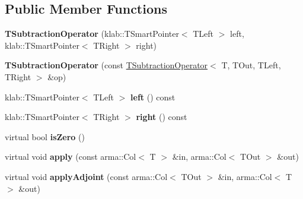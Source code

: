 \subsection*{Public Member Functions}
\begin{DoxyCompactItemize}
\item 
{\bfseries T\+Subtraction\+Operator} (klab\+::\+T\+Smart\+Pointer$<$ T\+Left $>$ left, klab\+::\+T\+Smart\+Pointer$<$ T\+Right $>$ right)\hypertarget{classkl1p_1_1TSubtractionOperator_a8eed24092100f90b1ef3cf6a87b5b385}{}\label{classkl1p_1_1TSubtractionOperator_a8eed24092100f90b1ef3cf6a87b5b385}

\item 
{\bfseries T\+Subtraction\+Operator} (const \hyperlink{classkl1p_1_1TSubtractionOperator}{T\+Subtraction\+Operator}$<$ T, T\+Out, T\+Left, T\+Right $>$ \&op)\hypertarget{classkl1p_1_1TSubtractionOperator_a0c53e2eefb1aac7df9517839f3235cdb}{}\label{classkl1p_1_1TSubtractionOperator_a0c53e2eefb1aac7df9517839f3235cdb}

\item 
klab\+::\+T\+Smart\+Pointer$<$ T\+Left $>$ {\bfseries left} () const \hypertarget{classkl1p_1_1TSubtractionOperator_a6fbc380e9cc3176aa841716d2ce92c34}{}\label{classkl1p_1_1TSubtractionOperator_a6fbc380e9cc3176aa841716d2ce92c34}

\item 
klab\+::\+T\+Smart\+Pointer$<$ T\+Right $>$ {\bfseries right} () const \hypertarget{classkl1p_1_1TSubtractionOperator_a3489bea4e6d6fe9a89e960a59f33b1a7}{}\label{classkl1p_1_1TSubtractionOperator_a3489bea4e6d6fe9a89e960a59f33b1a7}

\item 
virtual bool {\bfseries is\+Zero} ()\hypertarget{classkl1p_1_1TSubtractionOperator_a85bca636edf8c4c0c6c8446d3a225ff3}{}\label{classkl1p_1_1TSubtractionOperator_a85bca636edf8c4c0c6c8446d3a225ff3}

\item 
virtual void {\bfseries apply} (const arma\+::\+Col$<$ T $>$ \&in, arma\+::\+Col$<$ T\+Out $>$ \&out)\hypertarget{classkl1p_1_1TSubtractionOperator_a84f542029be029a5971ebbd2c86d1a67}{}\label{classkl1p_1_1TSubtractionOperator_a84f542029be029a5971ebbd2c86d1a67}

\item 
virtual void {\bfseries apply\+Adjoint} (const arma\+::\+Col$<$ T\+Out $>$ \&in, arma\+::\+Col$<$ T $>$ \&out)\hypertarget{classkl1p_1_1TSubtractionOperator_aab7800590ad3f807b4d30277af684eb4}{}\label{classkl1p_1_1TSubtractionOperator_aab7800590ad3f807b4d30277af684eb4}


\end{DoxyCompactItemize}
